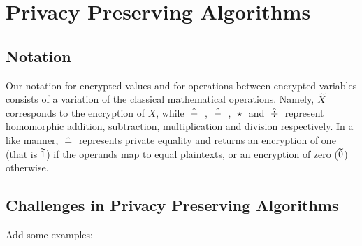 \chapter{Privacy Preserving Algorithms}\label{c:pp-algorithms}

\section{Notation}\label{s:notation}
Our notation for encrypted values and for operations between encrypted variables consists of a variation of the classical mathematical operations.
Namely, $\widetilde{X}$ corresponds to the encryption of $X$, while $\;\hat{+}\;$ , $\;\hat{-}\;$ , $\;\star\;$ and $\;\hat{\div}\;$ represent homomorphic addition, subtraction, multiplication and division respectively.
In a like manner, $\;\hat{=}\;$ represents private equality and returns an encryption of one (that is $\widetilde{1}$) if the operands map to equal plaintexts, or an encryption of zero ($\widetilde{0}$) otherwise.


\section{Challenges in Privacy Preserving Algorithms}\label{s:challenges}

Add some examples:








